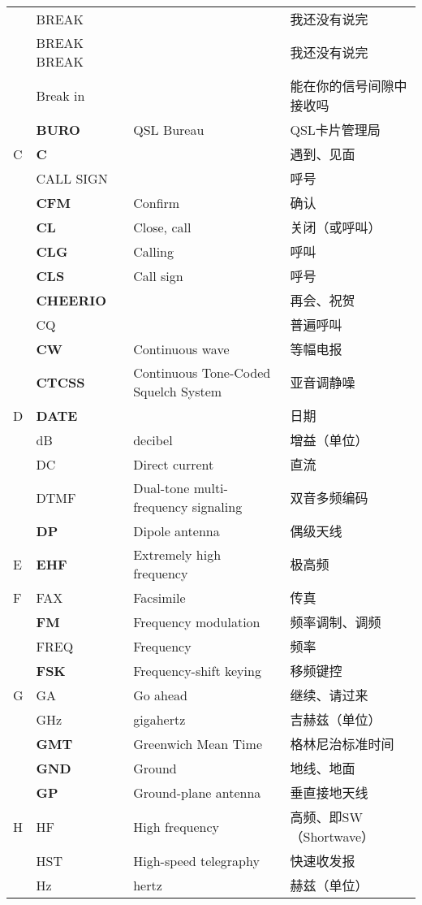 \begin{longtable}[l]{llll}
& BREAK & & 我还没有说完 \\
& BREAK BREAK & & 我还没有说完 \\
& Break in & & 能在你的信号间隙中接收吗 \\
& \textbf{BURO} & QSL Bureau & QSL卡片管理局 \\
C & \textbf{C} & & 遇到、见面 \\
& CALL SIGN & & 呼号 \\
& \textbf{CFM} & Confirm & 确认 \\
& \textbf{CL} & Close, call & 关闭（或呼叫） \\
& \textbf{CLG} & Calling & 呼叫 \\
& \textbf{CLS} & Call sign & 呼号 \\
& \textbf{CHEERIO} & & 再会、祝贺 \\
& CQ & & 普遍呼叫 \\
& \textbf{CW} & Continuous wave & 等幅电报 \\
& \textbf{CTCSS} & Continuous Tone-Coded Squelch System & 亚音调静噪 \\
D & \textbf{DATE} & & 日期 \\
& dB & decibel & 增益（单位） \\
& DC & Direct current & 直流 \\
& DTMF & Dual-tone multi-frequency signaling & 双音多频编码 \\
& \textbf{DP} & Dipole antenna & 偶级天线 \\
E & \textbf{EHF} & Extremely high frequency & 极高频 \\
F & FAX & Facsimile & 传真 \\
& \textbf{FM} & Frequency modulation & 频率调制、调频 \\
& FREQ & Frequency & 频率 \\
& \textbf{FSK} & Frequency-shift keying & 移频键控 \\
G & GA & Go ahead & 继续、请过来 \\
& GHz & gigahertz & 吉赫兹（单位） \\
& \textbf{GMT} & Greenwich Mean Time & 格林尼治标准时间 \\
& \textbf{GND} & Ground & 地线、地面 \\
& \textbf{GP} & Ground-plane antenna & 垂直接地天线 \\
H & HF & High frequency & 高频、即SW（Shortwave） \\
& HST & High-speed telegraphy & 快速收发报 \\
& Hz & hertz & 赫兹（单位） \\

\end{longtable}
